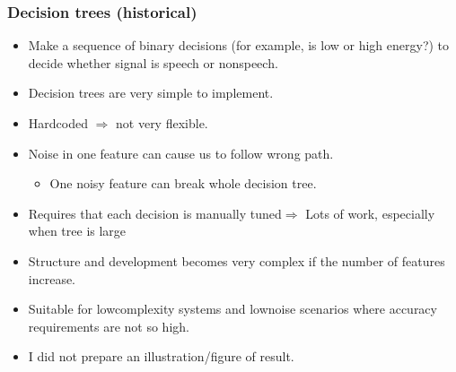 \documentclass[letterpaper,10pt,english]{jupyterBook}
\begin{document}
\subsubsection{Decision trees (historical)}
\label{\detokenize{Recognition/Voice_activity_detection:decision-trees-historical}}\begin{itemize}
\item {} 
\sphinxAtStartPar
Make a sequence of binary decisions (for example, is low or high
energy?) to decide whether signal is speech or non\sphinxhyphen{}speech.

\item {} 
\sphinxAtStartPar
Decision trees are very simple to implement.

\item {} 
\sphinxAtStartPar
Hard\sphinxhyphen{}coded \(\Rightarrow\) not very flexible.

\item {} 
\sphinxAtStartPar
Noise in one feature can cause us to follow wrong path.
\begin{itemize}
\item {} 
\sphinxAtStartPar
One noisy feature can break whole decision tree.

\end{itemize}

\item {} 
\sphinxAtStartPar
Requires that each decision is manually tuned\(\Rightarrow\) Lots of work, especially when tree is large

\item {} 
\sphinxAtStartPar
Structure and development becomes very complex if the number of
features increase.

\item {} 
\sphinxAtStartPar
Suitable for low\sphinxhyphen{}complexity systems and low\sphinxhyphen{}noise scenarios where
accuracy requirements are not so high.

\item {} 
\sphinxAtStartPar
I did not prepare an illustration/figure of result.

\end{itemize}

\sphinxAtStartPar
{}
\end{document}
